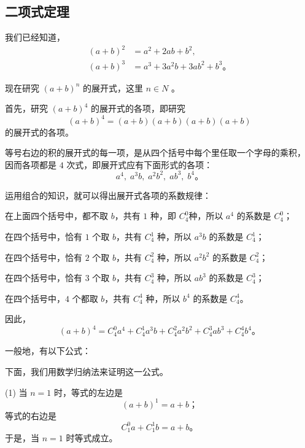 \subsection{二项式定理}\label{subsec:2-7}

我们已经知道，
\begin{align*}
    (a + b)^2 &= a^2 + 2ab + b^2 , \\
    (a + b)^3 &= a^3 + 3a^2b + 3ab^2 + b^3 \text{。}
\end{align*}

现在研究 $(a + b)^n$ 的展开式，这里 $n \in N$ 。

首先，研究 $(a + b)^4$ 的展开式的各项，即研究
$$ (a + b)^4  = (a + b) (a + b) (a + b) (a + b) $$
的展开式的各项。

等号右边的积的展开式的每一项，是从四个括号中每个里任取一个字母的乘积，
因而各项都是 $4$ 次式，即展开式应有下面形式的各项：
$$ a^4,\; a^3b,\; a^2b^2,\; ab^3,\; b^4 \text{。} $$

运用组合的知识，就可以得出展开式各项的系数规律：

在上面四个括号中，都不取 $b$，共有 $1$ 种，即 $C_4^0$种，所以 $a^4$ 的系数是 $C_4^0$；

在四个括号中，恰有 $1$ 个取 $b$，共有 $C_4^1$ 种，所以 $a^3b$ 的系数是 $C_4^1$；

在四个括号中，恰有 $2$ 个取 $b$，共有 $C_4^2$ 种，所以 $a^2b^2$ 的系数是 $C_4^2$；

在四个括号中，恰有 $3$ 个取 $b$，共有 $C_4^3$ 种，所以 $ab^3$ 的系数是 $C_4^3$；

在四个括号中，$4$ 个都取 $b$，共有 $C_4^4$ 种，所以 $b^4$ 的系数是 $C_4^4$。

因此，
$$ (a + b)^4 = C_4^0 a^4 + C_4^1 a^3b + C_4^2 a^2b^2 + C_4^3 ab^3 + C_4^4 b^4 \text{。} $$

一般地，有以下公式：
\begin{center}
\end{center}

下面，我们用数学归纳法来证明这一公式。

\zhengming (1) 当 $n = 1$ 时，等式的左边是
$$ (a + b)^1 = a + b \text{；} $$
等式的右边是
$$ C_1^0 a + C_1^1 b = a + b \text{。} $$
于是，当 $n = 1$ 时等式成立。

